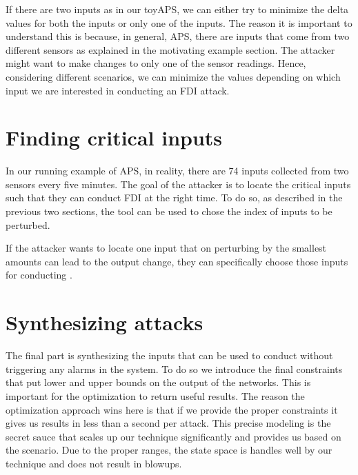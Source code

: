 If there are two inputs as in our toyAPS, we can either try to minimize the delta values for both the inputs or only one of the inputs. The reason it is important to understand this is because, in general, APS, there are inputs that come from two different sensors as explained in the motivating example section. %
The attacker might want to make changes to only one of the sensor readings. Hence, considering different scenarios, we can minimize the values depending on which input we are interested in conducting an FDI attack. 

\section{Finding critical inputs}
In our running example of APS, in reality, there are 74 inputs collected from two sensors every five minutes. The goal of the attacker is to locate the critical inputs such that they can conduct FDI at the right time. To do so, as described in the previous two sections, the tool can be used to chose the index of inputs to be perturbed. 

If the attacker wants to locate one input that on perturbing by the smallest amounts can lead to the output change, they can specifically choose those inputs for conducting \attack.

\label{section:cost function}
\section{Synthesizing attacks}
The final part is synthesizing the inputs that can be used to conduct \attack without triggering any alarms in the system. To do so we introduce the final constraints that put lower and upper bounds on the output of the networks. This is important for the optimization to return useful results. The reason the optimization approach wins here is that if we provide the proper constraints it gives us results in less than a second per attack. This precise modeling is the secret sauce that scales up our technique significantly and provides us \attack based on the scenario. Due to the proper ranges, the state space is handles well by our technique and does not result in blowups. 

